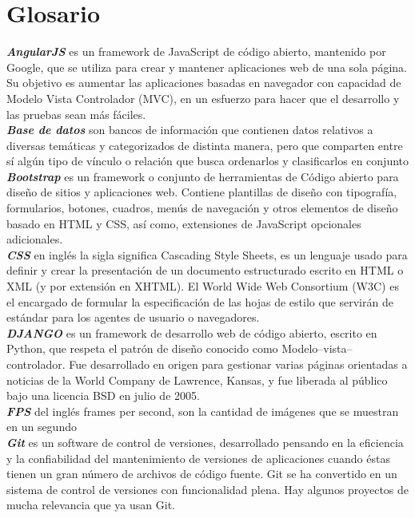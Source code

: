\documentclass[12pt]{article}
\begin{document}
\clearpage
\section{Glosario}
\textbf{\textit{AngularJS}} es un framework de JavaScript de código abierto, mantenido por Google, que se utiliza para crear y mantener aplicaciones web de una sola página. Su objetivo es aumentar las aplicaciones basadas en navegador con capacidad de Modelo Vista Controlador (MVC), en un esfuerzo para hacer que el desarrollo y las pruebas sean más fáciles.\\
\textbf{\textit{Base de datos}} son bancos de información que contienen datos relativos a diversas temáticas y categorizados de distinta manera, pero que comparten entre sí algún tipo de vínculo o relación que busca ordenarlos y clasificarlos en conjunto\\
\textbf{\textit{Bootstrap}} es un framework o conjunto de herramientas de Código abierto para diseño de sitios y aplicaciones web. Contiene plantillas de diseño con tipografía, formularios, botones, cuadros, menús de navegación y otros elementos de diseño basado en HTML y CSS, así como, extensiones de JavaScript opcionales adicionales.\\
\textbf{\textit{CSS}} en inglés la sigla significa Cascading Style Sheets, es un lenguaje usado para definir y crear la presentación de un documento estructurado escrito en HTML o XML (y por extensión en XHTML). El World Wide Web Consortium (W3C) es el encargado de formular la especificación de las hojas de estilo que servirán de estándar para los agentes de usuario o navegadores.\\
\textbf{\textit{DJANGO}} es un framework de desarrollo web de código abierto, escrito en Python, que respeta el patrón de diseño conocido como Modelo–vista–controlador. Fue desarrollado en origen para gestionar varias páginas orientadas a noticias de la World Company de Lawrence, Kansas, y fue liberada al público bajo una licencia BSD en julio de 2005.\\
\textbf{\textit{FPS}} del inglés frames per second, son la cantidad de imágenes que se muestran en un segundo\\
\textbf{\textit{Git}}  es un software de control de versiones, desarrollado pensando en la eficiencia y la confiabilidad del mantenimiento de versiones de aplicaciones cuando éstas tienen un gran número de archivos de código fuente. Git se ha convertido en un sistema de control de versiones con funcionalidad plena. Hay algunos proyectos de mucha relevancia que ya usan Git.\\
\end{document}

